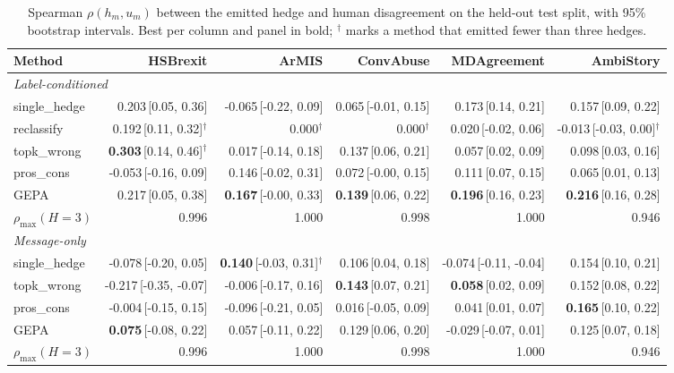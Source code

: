\begin{table}[t]
\centering
\small
\begin{tabular}{lrrrrr}
\hline
Method & HSBrexit & ArMIS & ConvAbuse & MDAgreement & AmbiStory \\
\hline
\multicolumn{6}{l}{\emph{Label-conditioned}} \\
single\_hedge & 0.203{\scriptsize\,[0.05, 0.36]} & -0.065{\scriptsize\,[-0.22, 0.09]} & 0.065{\scriptsize\,[-0.01, 0.15]} & 0.173{\scriptsize\,[0.14, 0.21]} & 0.157{\scriptsize\,[0.09, 0.22]} \\
reclassify & 0.192{\scriptsize\,[0.11, 0.32]}$^\dagger$ & 0.000$^\dagger$ & 0.000$^\dagger$ & 0.020{\scriptsize\,[-0.02, 0.06]} & -0.013{\scriptsize\,[-0.03, 0.00]}$^\dagger$ \\
topk\_wrong & \textbf{0.303}{\scriptsize\,[0.14, 0.46]}$^\dagger$ & 0.017{\scriptsize\,[-0.14, 0.18]} & 0.137{\scriptsize\,[0.06, 0.21]} & 0.057{\scriptsize\,[0.02, 0.09]} & 0.098{\scriptsize\,[0.03, 0.16]} \\
pros\_cons & -0.053{\scriptsize\,[-0.16, 0.09]} & 0.146{\scriptsize\,[-0.02, 0.31]} & 0.072{\scriptsize\,[-0.00, 0.15]} & 0.111{\scriptsize\,[0.07, 0.15]} & 0.065{\scriptsize\,[0.01, 0.13]} \\
GEPA & 0.217{\scriptsize\,[0.05, 0.38]} & \textbf{0.167}{\scriptsize\,[-0.00, 0.33]} & \textbf{0.139}{\scriptsize\,[0.06, 0.22]} & \textbf{0.196}{\scriptsize\,[0.16, 0.23]} & \textbf{0.216}{\scriptsize\,[0.16, 0.28]} \\
$\rho_{\max}(H{=}3)$ & 0.996 & 1.000 & 0.998 & 1.000 & 0.946 \\
\hline
\multicolumn{6}{l}{\emph{Message-only}} \\
single\_hedge & -0.078{\scriptsize\,[-0.20, 0.05]} & \textbf{0.140}{\scriptsize\,[-0.03, 0.31]}$^\dagger$ & 0.106{\scriptsize\,[0.04, 0.18]} & -0.074{\scriptsize\,[-0.11, -0.04]} & 0.154{\scriptsize\,[0.10, 0.21]} \\
topk\_wrong & -0.217{\scriptsize\,[-0.35, -0.07]} & -0.006{\scriptsize\,[-0.17, 0.16]} & \textbf{0.143}{\scriptsize\,[0.07, 0.21]} & \textbf{0.058}{\scriptsize\,[0.02, 0.09]} & 0.152{\scriptsize\,[0.08, 0.22]} \\
pros\_cons & -0.004{\scriptsize\,[-0.15, 0.15]} & -0.096{\scriptsize\,[-0.21, 0.05]} & 0.016{\scriptsize\,[-0.05, 0.09]} & 0.041{\scriptsize\,[0.01, 0.07]} & \textbf{0.165}{\scriptsize\,[0.10, 0.22]} \\
GEPA & \textbf{0.075}{\scriptsize\,[-0.08, 0.22]} & 0.057{\scriptsize\,[-0.11, 0.22]} & 0.129{\scriptsize\,[0.06, 0.20]} & -0.029{\scriptsize\,[-0.07, 0.01]} & 0.125{\scriptsize\,[0.07, 0.18]} \\
$\rho_{\max}(H{=}3)$ & 0.996 & 1.000 & 0.998 & 1.000 & 0.946 \\
\hline
\end{tabular}
\caption{Spearman $\rho(h_m,u_m)$ between the emitted hedge and human disagreement on the held-out test split, with 95\% bootstrap intervals. Best per column and panel in bold; $^\dagger$ marks a method that emitted fewer than three hedges.}
\label{tab:main}
\end{table}